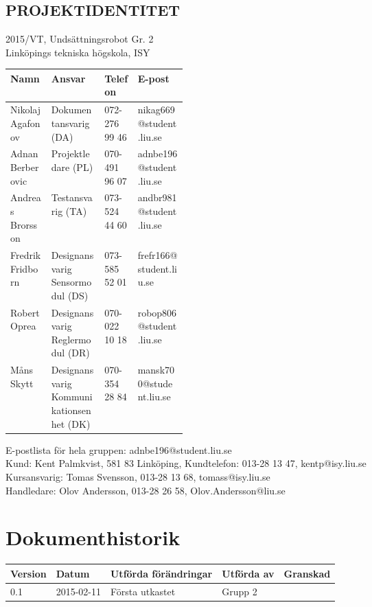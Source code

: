 \documentclass[11pt]{article}
\begin{document}
\pagebreak
\begin{center}

\section*{PROJEKTIDENTITET}
2015/VT, Undsättningsrobot Gr. 2
\\
Linköpings tekniska högskola, ISY
\\[0.5in]
\begin{table}[h]
\begin{tabular}{|l|p{0.3\linewidth}|l|l|} \hline
Namn & Ansvar & Telefon & E-post \\[0.1in] \hline
Nikolaj Agafonov & Dokumentansvarig (DA) & 072-276 99 46 & nikag669@student.liu.se \\ \hline
Adnan Berberovic & Projektledare (PL) & 070-491 96 07 & adnbe196@student.liu.se \\ \hline
Andreas Brorsson & Testansvarig (TA) & 073-524 44 60 & andbr981@student.liu.se \\ \hline
Fredrik Fridborn & Designansvarig Sensormodul (DS) & 073-585 52 01 & frefr166@student.liu.se \\ \hline
Robert Oprea & Designansvarig Reglermodul (DR) & 070-022 10 18 & robop806@student.liu.se \\ \hline
Måns Skytt & Designansvarig Kommunikationsenhet (DK) & 070-354 28 84 & mansk700@student.liu.se \\ \hline
\end{tabular}
\end{table}

E-postlista för hela gruppen: adnbe196@student.liu.se
\\[1in]
Kund: Kent Palmkvist, 581 83 Linköping,
Kundtelefon: 013-28 13 47, kentp@isy.liu.se
\\[1in]
Kursansvarig: Tomas Svensson, 013-28 13 68, tomass@isy.liu.se
\\
Handledare: Olov Andersson, 013-28 26 58, Olov.Andersson@liu.se
\end{center}
\pagebreak

\tableofcontents

\pagebreak

\section*{Dokumenthistorik}
\begin{table}[h]
\begin{tabular}{|l|l|l|l|l|} \hline

Version & 
Datum & 
Utförda förändringar & 
Utförda av & 
Granskad \\[0.1in] \hline
0.1 &
2015-02-11 & 
Första utkastet & 
Grupp 2 & 
\\ \hline

\end{tabular}
\end{table}
\end{document}
